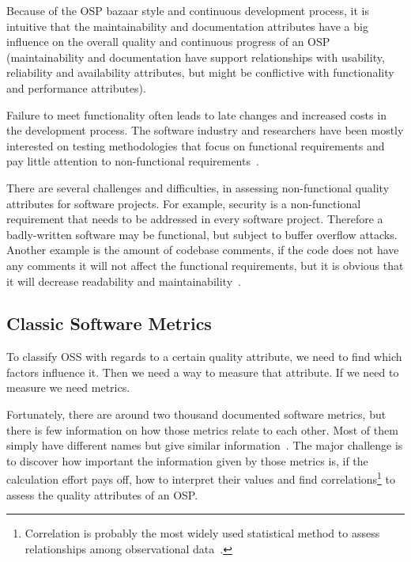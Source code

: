 Because of the OSP bazaar style and continuous development process, it is intuitive that the maintainability and documentation attributes
have a big influence on the overall quality and continuous progress of an OSP
(maintainability and documentation have support relationships
with usability, reliability and availability attributes, but might be conflictive with functionality and performance attributes).

Failure to meet functionality often leads to late changes and increased costs in the development process.
The software industry and researchers have been mostly interested on testing methodologies
that focus on functional requirements and pay little attention to non-functional requirements~\cite{chung2009non}.

There are several challenges and difficulties, in assessing non-functional quality attributes for software projects.
For example, security is a non-functional requirement that needs to be addressed in every software project.
Therefore a badly-written software may be functional, but subject to buffer overflow attacks.
Another example is the amount of codebase comments, if the code does not have any comments it will not affect the functional requirements,
but it is obvious that it will decrease readability and maintainability~\cite{gousios2007software}.

\subsection{Classic Software Metrics}
To classify OSS with regards to a certain quality attribute, we need to find which factors influence it.
Then we need a way to measure that attribute. If we need to measure we need metrics.

Fortunately, there are around two thousand documented software metrics, but there is few information on how those metrics relate to each other.
Most of them simply have different names but give similar information~\cite{fenton1999software}.
The major challenge is to discover how important the information given by those metrics is, if the calculation effort pays off,
how to interpret their values and find
\textsf{correlations}\footnote{Correlation is probably the most widely used statistical method to assess relationships among observational data~\cite{kan2002metrics}.}
 to assess the quality attributes of an OSP.


